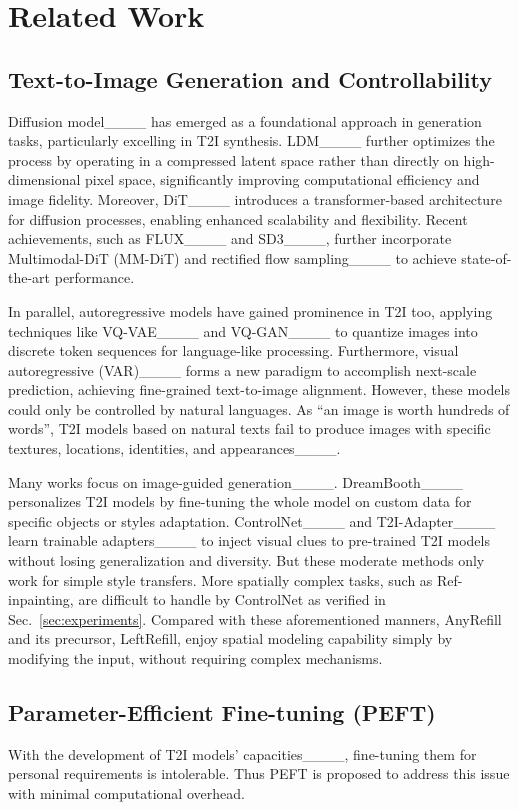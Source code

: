 \section{Related Work}
\subsection{Text-to-Image Generation and Controllability}
Diffusion model____ has emerged as a foundational approach in generation tasks, particularly excelling in T2I synthesis. LDM____ further optimizes the process by operating in a compressed latent space rather than directly on high-dimensional pixel space, significantly improving computational efficiency and image fidelity. 
Moreover, DiT____ introduces a transformer-based architecture for diffusion processes, enabling enhanced scalability and flexibility. 
Recent achievements, such as FLUX____ and SD3____, further incorporate Multimodal-DiT (MM-DiT) and rectified flow sampling____ to achieve state-of-the-art performance. 

In parallel, autoregressive models have gained prominence in T2I too, applying techniques like VQ-VAE____ and VQ-GAN____ to quantize images into discrete token sequences for language-like processing. 
Furthermore, visual autoregressive (VAR)____ forms a new paradigm to accomplish next-scale prediction, achieving fine-grained text-to-image alignment. 
However, these models could only be controlled by natural languages. As ``an image is worth hundreds of words'', T2I models based on natural texts fail to produce images with specific textures, locations, identities, and appearances____. 

Many works focus on image-guided generation____. DreamBooth____ personalizes T2I models by fine-tuning the whole model on custom data for specific objects or styles adaptation. ControlNet____ and T2I-Adapter____ learn trainable adapters____ to inject visual clues to pre-trained T2I models without losing generalization and diversity.
But these moderate methods only work for simple style transfers. More spatially complex tasks, such as Ref-inpainting, are difficult to handle by ControlNet as verified in Sec.~\ref{sec:experiments}. 
Compared with these aforementioned manners, AnyRefill and its precursor, LeftRefill, enjoy spatial modeling capability simply by modifying the input, without requiring complex mechanisms.

\subsection{Parameter-Efficient Fine-tuning (PEFT)}
With the development of T2I models' capacities____, fine-tuning them for personal requirements is intolerable. Thus PEFT is proposed to address this issue with minimal computational overhead.

